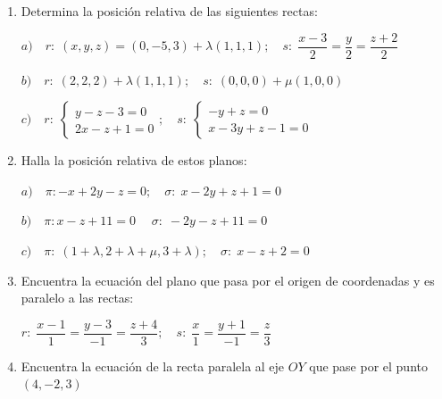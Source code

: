\begin{enumerate}

\item Determina la posición relativa de las siguientes rectas:

 $a)\quad r:\; (x,y,z)=(0,-5,3)+\lambda(1,1,1);\quad s:\; \dfrac{x-3}{2}=\dfrac{y}{2}=\dfrac{z+2}{2}$

 $b) \quad r:\; (2,2,2)+\lambda(1,1,1);\quad s:\; (0,0,0)+\mu(1,0,0)$
 
 $c)\quad r:\; \begin{cases} y-z-3=0 \\ 2x-z+1=0 \end{cases}; \quad s:\; \begin{cases} -y+z=0 \\ x-3y+z-1=0 \end{cases}$

\vspace{2mm} 

\item Halla la posición relativa de estos planos:

$a) \quad \pi: -x+2y-z=0;\quad \sigma:\; x-2y+z+1=0$

$b) \quad \pi: x-z+11=0  \;\quad \sigma:\; -2y-z+11=0  $

$c) \quad \pi:\; (1+\lambda, 2+\lambda+\mu,3+\lambda) ;\quad \sigma:\; x-z+2=0 $
 
\vspace{2mm} 

\item Encuentra la ecuación del plano que pasa por el origen de coordenadas y es paralelo a las rectas:

$r:\; \dfrac{x-1}{1}=\dfrac{y-3}{-1}=\dfrac{z+4}{3};\quad s:\; \dfrac{x}{1}=\dfrac{y+1}{-1}=\dfrac{z}{3}$

\vspace{2mm} 

\item Encuentra la ecuación de la recta paralela al eje $OY$ que pase por el punto $(4,-2,3)$

\vspace{2mm} 


\end{enumerate}
